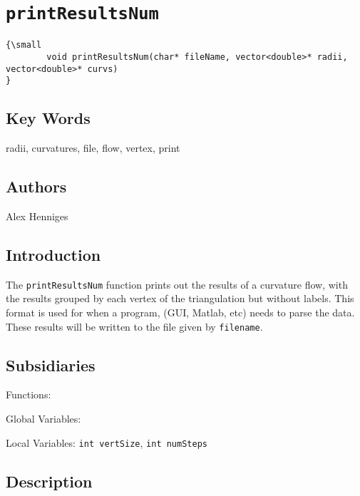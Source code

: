                       


\section*{\texttt{printResultsNum}}

\label{f0}{\small }
\begin{verbatim}
{\small 
        void printResultsNum(char* fileName, vector<double>* radii, vector<double>* curvs)
}
\end{verbatim}

\subsection*{Key Words}

radii, curvatures, file, flow, vertex, print

\subsection*{Authors}

Alex Henniges

\subsection*{Introduction}

The \texttt{printResultsNum} function prints out the results of a curvature
flow, with the results grouped by each vertex of the triangulation but
without labels. This format is used for when a program, (GUI, Matlab, etc)
needs to parse the data. These results will be written to the file given by 
\texttt{filename}.

\subsection*{Subsidiaries}

Functions:

Global Variables:

Local Variables: \texttt{int vertSize}, \texttt{int numSteps}

\subsection*{Description}

